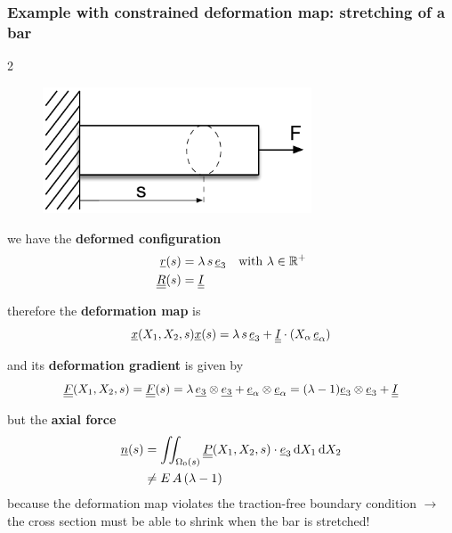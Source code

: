 \begin{frame}
  \frametitle{Example with constrained deformation map: stretching of a bar}
  
  \vspace{-1em}
  \begin{multicols}{2}
    \noindent
    \begin{figure}
      \centering
      \includegraphics[width=8cm, keepaspectratio=true]{sections/cosserat_rods/images/ExampleConstrainedMapStretchingBar}
    \end{figure}
    
    we have the \textbf{deformed configuration}
    \begin{displaymath}
      \begin{alignedat}{1}
        \underline{r}(s) &= \lambda \, s \, \underline{e}_3 \quad \text{with } \lambda \in \mathbb{R}^{+} \\
        \underline{\underline{R}}(s) &= \underline{\underline{I}} \\
      \end{alignedat}
    \end{displaymath}
  \end{multicols}
  
  \vspace{-0.5em}
  therefore the \textbf{deformation map} is
  \begin{displaymath}
    \underline{x}(X_1,X_2,s) \underline{x}(s) = \lambda \, s \, \underline{e}_3 + \underline{\underline{I}} \cdot (X_{\alpha} \, \underline{e}_{\alpha})
  \end{displaymath}
  
  and its \textbf{deformation gradient} is given by
  \begin{displaymath}
    \underline{\underline{F}}(X_1,X_2,s) = \underline{\underline{F}}(s) = \lambda \, \underline{e_3} \otimes \underline{e_3} + \underline{e}_{\alpha} \otimes \underline{e}_{\alpha} = (\lambda - 1) \underline{e}_3 \otimes \underline{e}_3 + \underline{\underline{I}}  
  \end{displaymath}
  
  but the \textbf{axial force}
  \begin{displaymath}
    \begin{alignedat}{1}
      \underline{n}(s) &= \iint_{\Omega_0(s)} \doubleunderline{P}(X_1, X_2, s) \cdot \underline{e}_3 \dif X_1 \dif X_2 \\
      &\neq E \, A \, (\lambda - 1)
    \end{alignedat}
  \end{displaymath}
  because the deformation map violates the traction-free boundary condition \newline
  $\rightarrow$ the cross section must be able to shrink when the bar is stretched!
\end{frame}


